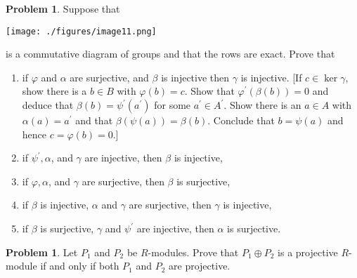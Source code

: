 \documentclass{amsart}
\numberwithin{equation}{section}
\theoremstyle{definition}
\newtheorem{problem}[thm]{Problem}
\begin{document}
\begin{problem}
 Suppose that
 \begin{center}
  \texttt{[image: ./figures/image11.png]}
\end{center}
is a commutative diagram of groups and that the rows are exact. Prove that
\begin{enumerate}
\item if \(\varphi\) and \(\alpha\) are surjective, and \(\beta\) is injective then \(\gamma\) is injective. [If \(c \in \operatorname{ker} \gamma\), show there is a \(b \in B\) with \(\varphi(b)=c\). Show that \(\varphi^{\prime}(\beta(b))=0\) and deduce that \(\beta(b)=\psi^{\prime}\left(a^{\prime}\right)\) for some \(a^{\prime} \in A^{\prime}\). Show there is an \(a \in A\) with \(\alpha(a)=a^{\prime}\) and that \(\beta(\psi(a))=\beta(b)\). Conclude that \(b=\psi(a)\) and hence \(c=\varphi(b)=0\).]
\item if \(\psi^{\prime}, \alpha\), and \(\gamma\) are injective, then \(\beta\) is injective,
\item if \(\varphi, \alpha\), and \(\gamma\) are surjective, then \(\beta\) is surjective,
\item if \(\beta\) is injective, \(\alpha\) and \(\gamma\) are surjective, then \(\gamma\) is injective,
\item if \(\beta\) is surjective, \(\gamma\) and \(\psi^{\prime}\) are injective, then \(\alpha\) is surjective.
\end{enumerate}


\end{problem}


\begin{problem}
   Let \(P_1\) and \(P_2\) be \(R\)-modules. Prove that \(P_1 \oplus P_2\) is a projective \(R\)-module if and only if both \(P_1\) and \(P_2\) are projective.
\end{problem}
\end{document}
